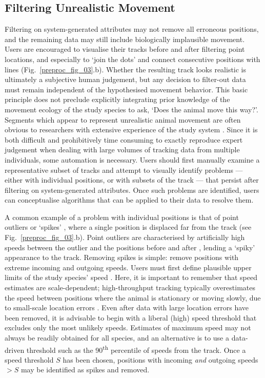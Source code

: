 \subsection*{Filtering Unrealistic Movement}

Filtering on system-generated attributes may not remove all erroneous positions, and the remaining data may still include biologically implausible movement.
Users are encouraged to visualise their tracks before and after filtering point locations, and especially to `join the dots' and connect consecutive positions with lines (Fig.~\ref{preproc_fig_03}.b).
Whether the resulting track looks realistic is ultimately a subjective human judgement, but any decision to filter-out data must remain independent of the hypothesised movement behavior.
This basic principle does not preclude explicitly integrating prior knowledge of the movement ecology of the study species to ask, `Does the animal move this way?'.
Segments which appear to represent unrealistic animal movement are often obvious to researchers with extensive experience of the study system \citep[the non-movement approach; see][]{bjorneraas2010}.
Since it is both difficult and prohibitively time consuming to exactly reproduce expert judgement when dealing with large volumes of tracking data from multiple individuals, some automation is necessary.
Users should first manually examine a representative subset of tracks and attempt to visually identify problems --- either with individual positions, or with subsets of the track --- that persist after filtering on system-generated attributes.
Once such problems are identified, users can conceptualise algorithms that can be applied to their data to resolve them.

A common example of a problem with individual positions is that of point outliers or `spikes' \citep{bjorneraas2010}, where a single position is displaced far from the track (see Fig.~\ref{preproc_fig_03}.b).
Point outliers are characterised by artificially high speeds between the outlier and the positions before and after \citep[called incoming and outgoing speed, respectively;][]{bjorneraas2010}, lending a `spiky' appearance to the track.
Removing spikes is simple: remove positions with extreme incoming and outgoing speeds.
Users must first define plausible upper limits of the study species' speed \citep{calenge2009, seidel2018}.
Here, it is important to remember that speed estimates are scale-dependent; high-throughput tracking typically overestimates the speed between positions where the animal is stationary or moving slowly, due to small-scale location errors \citep{ranacher2016, noonan2019}. 
Even after data with large location errors have been removed, it is advisable to begin with a liberal (high) speed threshold that excludes only the most unlikely speeds.
Estimates of maximum speed may not always be readily obtained for all species, and an alternative is to use a data-driven threshold such as the 90\textsuperscript{th} percentile of speeds from the track.
Once a speed threshold $S$ has been chosen, positions with incoming \textit{and} outgoing speeds $> S$ may be identified as spikes and removed.


